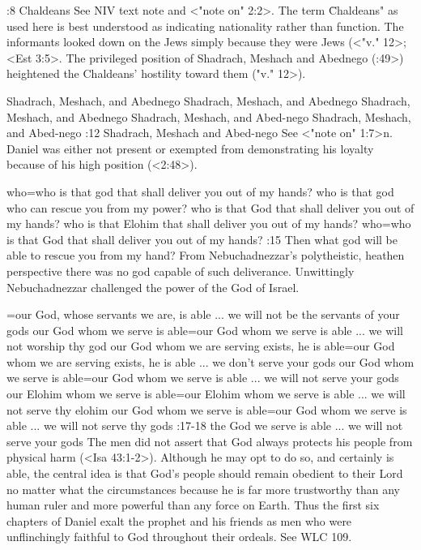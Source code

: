 :8 {Chaldeans} See NIV text note and <"note on" 2:2>. The term 
 \"Chaldeans" as used here is best understood as indicating nationality rather than function. The
informants looked down on the  
Jews simply because they were Jews (<"v." 12>; <Est 3:5>. The privileged position of Shadrach, Meshach and
Abednego (:49>) heightened the Chaldeans' hostility toward them (\<"v." 12>). 

    {Shadrach, Meshach, and Abednego} %
    {Shadrach, Meshach, and Abednego} %
    {Shadrach, Meshach, and Abednego} %
    {Shadrach, Meshach, and Abed-nego} %
    {Shadrach, Meshach, and Abed-nego} %
:12 {Shadrach, Meshach and Abed-nego} See <"note on" 1:7>n. Daniel was either not present or exempted from
demonstrating his loyalty because of his high position (<2:48>).


    {who}={who is that god that shall deliver you out of my hands?} %
    {who is that god who can rescue you from my power?} %
    {who is that God that shall deliver you out of my hands?} %
    {who is that Elohim that shall deliver you out of my hands?} %
    {who}={who is that God that shall deliver you out of my hands?} %
:15 {Then what god will be able to rescue you from my 
hand?} From Nebuchadnezzar's polytheistic, heathen perspective 
there was no god capable of such deliverance. Unwittingly Nebuchadnezzar challenged the power of the
God of Israel. 

={our God, whose servants we are, is able ... we will not be the servants of your gods} %
    {our God whom we serve is able}={our God whom we serve is able ... we will not worship thy god} %
    {our God whom we are serving exists, he is able}={our God whom we are serving exists, he is able ... we don’t serve your gods} %
    {our God whom we serve is able}={our God whom we serve is able ... we will not serve your gods} %
    {our Elohim whom we serve is able}={our Elohim whom we serve is able ... we will not serve thy elohim} %
    {our God whom we serve is able}={our God whom we serve is able ... we will not serve thy gods} %
:17-18 {the God we serve is able ... we will not serve your gods} The men did not assert that God
always protects his people from physical harm (<Isa 43:1-2>). Although he may opt to do so, and
certainly is able, the central idea is that God's people should remain obedient to their Lord no
matter what the circumstances because he is far more trustworthy than any human ruler and more
powerful than any force on Earth. Thus the first six chapters of Daniel exalt the prophet and his
friends as men who were unflinchingly faithful to God throughout their ordeals. See WLC 109.

